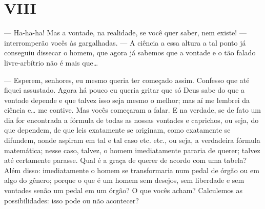 \section{VIII}

--- Ha-ha-ha! Mas a vontade, na realidade, se você quer saber, nem existe!
--- interromperão vocês às gargalhadas. --- A ciência a essa altura a tal
ponto já conseguiu dissecar o homem, que agora já sabemos que a vontade
e o tão falado livre{}-arbítrio não é mais que\ldots{}

--- Esperem, senhores, eu mesmo queria ter começado assim. Confesso que
até fiquei assustado. Agora há pouco eu queria gritar que só Deus sabe
do que a vontade depende e que talvez isso seja mesmo o melhor; mas aí
me lembrei da ciência e\ldots{} me contive. Mas vocês começaram a falar. E
na verdade, se de fato um dia for encontrada a fórmula de todas as
nossas vontades e caprichos, ou seja, do que dependem, de que leis
exatamente se originam, como exatamente se difundem, aonde aspiram em
tal e tal caso etc. etc., ou seja, a verdadeira fórmula matemática;
nesse caso, talvez, o homem imediatamente pararia de querer; talvez até
certamente parasse. Qual é a graça de querer de acordo com uma tabela?
Além disso: imediatamente o homem se transformaria num pedal de órgão
ou em algo do gênero; porque o que é um homem sem desejos, sem
liberdade e sem vontades senão um pedal em um órgão? O que vocês
acham? Calculemos as possibilidades: isso pode ou não acontecer?

